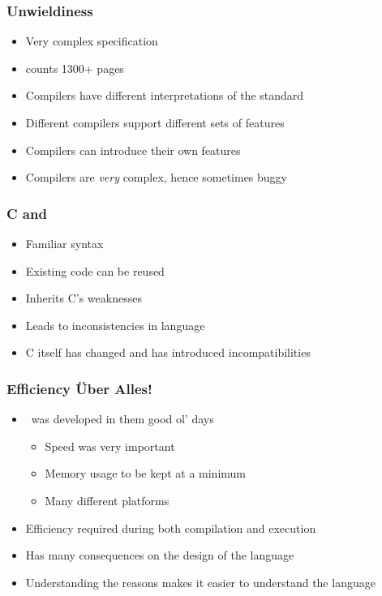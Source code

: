 \documentclass{../ucll-slides}
\begin{document}
\begin{frame}
  \frametitle{Unwieldiness}
  \begin{itemize}
    \item Very complex specification
    \item {}
          counts 1300+ pages 
    \item Compilers have different interpretations of the standard
    \item Different compilers support different sets of features
    \item Compilers can introduce their own features
    \item Compilers are \emph{very} complex, hence sometimes buggy
  \end{itemize}
\end{frame}

\begin{frame}
  \frametitle{C and \cpp}
  \begin{itemize}
    \item Familiar syntax
    \item Existing code can be reused
  \end{itemize}
  \vskip5mm
  \begin{itemize}
    \item Inherits C's weaknesses
    \item Leads to inconsistencies in language
  \end{itemize}
  \vskip5mm
  \begin{itemize}
    \item C itself has changed and has introduced incompatibilities
  \end{itemize}
\end{frame}

\begin{frame}
  \frametitle{Efficiency \"Uber Alles!}
  \begin{itemize}
    \item \cpp\ was developed in them good ol' days
          \begin{itemize}
            \item Speed was very important
            \item Memory usage to be kept at a minimum
            \item Many different platforms
          \end{itemize}
    \item Efficiency required during both compilation and execution
    \item Has many consequences on the design of the language
    \item Understanding the reasons makes it easier to understand the language
  \end{itemize}
\end{frame}
\end{document}
